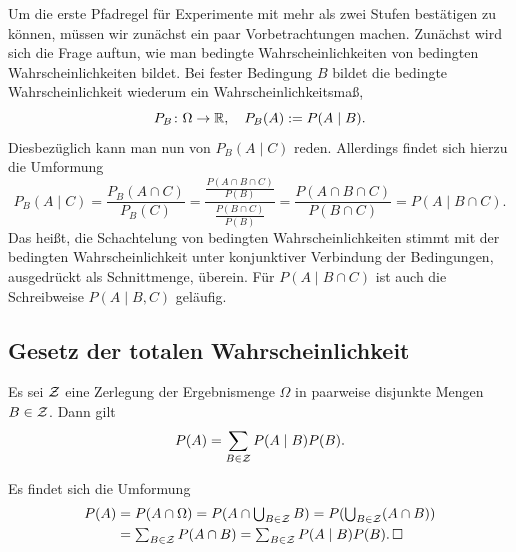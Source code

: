 \noindent
Um die erste Pfadregel für Experimente mit mehr als zwei Stufen bestätigen
zu können, müssen wir zunächst ein paar Vorbetrachtungen machen.
Zunächst wird sich die Frage auftun, wie man bedingte Wahrscheinlichkeiten
von bedingten Wahrscheinlichkeiten bildet. Bei fester Bedingung $B$
bildet die bedingte Wahrscheinlichkeit wiederum ein Wahrscheinlichkeitsmaß,%
\[P_B\colon\Omega\to\mathbb R,\quad P_B(A) := P(A\mid B).\]
Diesbezüglich kann man nun von $P_B(A\mid C)$ reden. Allerdings findet
sich hierzu die Umformung%
\[P_B(A\mid C) = \frac{P_B(A\cap C)}{P_B(C)}
= \frac{\frac{P(A\cap B\cap C)}{P(B)}}{\frac{P(B\cap C)}{P(B)}}
= \frac{P(A\cap B\cap C)}{P(B\cap C)} = P(A\mid B\cap C).\]
Das heißt, die Schachtelung von bedingten Wahrscheinlichkeiten stimmt
mit der bedingten Wahrscheinlichkeit unter konjunktiver Verbindung der
Bedingungen, ausgedrückt als Schnittmenge, überein. Für $P(A\mid B\cap C)$
ist auch die Schreibweise $P(A\mid B,C)$ geläufig.

\subsection{Gesetz der totalen Wahrscheinlichkeit}

\begin{Satz}\newlinefirst
Es sei $\mathcal{Z}$ eine Zerlegung der Ergebnismenge $\Omega$ in
paarweise disjunkte Mengen $B\in\mathcal{Z}$. Dann gilt
\[P(A) = \sum_{B\in\mathcal{Z}}P(A\mid B)P(B).\]
\end{Satz}
\begin{Beweis}
Es findet sich die Umformung
\begin{align*}
P(A) &= \textstyle P(A\cap\Omega) = P(A\cap\bigcup_{B\in\mathcal{Z}} B)
= P(\bigcup_{B\in\mathcal{Z}} (A\cap B))\\
&=\textstyle\sum_{B\in\mathcal{Z}} P(A\cap B)
= \sum_{B\in\mathcal{Z}} P(A\mid B)P(B).\,\Box
\end{align*}
\end{Beweis}
